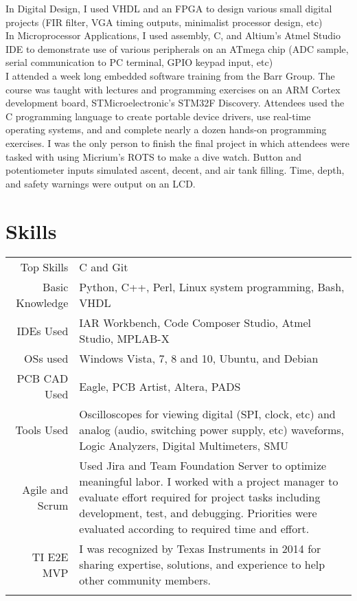 \documentclass[a4paper,10pt]{article} %
\begin{document}
In Digital Design, I used VHDL and an FPGA to design various small digital projects (FIR filter, VGA timing outputs, minimalist processor design, etc)\\

In Microprocessor Applications, I used assembly, C, and Altium's Atmel Studio IDE to demonstrate use of various peripherals on an ATmega chip (ADC sample, serial communication to PC terminal, GPIO keypad input, etc)\\

I attended a week long embedded software training from the Barr Group. The course was taught with lectures and programming exercises on an ARM Cortex development board, STMicroelectronic's STM32F Discovery. Attendees used the C programming language to create portable device drivers, use real-time operating systems, and and complete nearly a dozen hands-on programming exercises. I was the only person to finish the final project in which attendees were tasked with using Micrium's ROTS to make a dive watch. Button and potentiometer inputs simulated ascent, decent, and air tank filling. Time, depth, and safety warnings were output on an LCD.\\


\section{Skills}

\begin{tabular}{rp{12.4cm}}
Top Skills & C and Git\\
Basic Knowledge & Python, C++, Perl, Linux system programming, Bash, VHDL\\
IDEs Used & IAR Workbench, Code Composer Studio, Atmel Studio, MPLAB-X\\
OSs used & Windows Vista, 7, 8 and 10, Ubuntu, and Debian\\
PCB CAD Used & Eagle, PCB Artist, Altera, PADS\\
Tools Used &  Oscilloscopes for viewing digital (SPI, clock, etc) and analog (audio, switching power supply, etc) waveforms, Logic Analyzers, Digital Multimeters, SMU\\
Agile and Scrum & Used Jira and Team Foundation Server to optimize meaningful labor. I worked with a project manager to evaluate effort required for project tasks including development, test, and debugging. Priorities were evaluated according to required time and effort.\\
TI E2E MVP & I was recognized by Texas Instruments in 2014 for sharing expertise, solutions, and experience to help other community members.\\
\\
\end{tabular}
\end{document}
